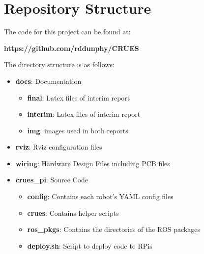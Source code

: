 
\chapter{Repository Structure}
\label{appendix/a}

The code for this project can be found at:
\begin{center}
\textbf{https://github.com/rddunphy/CRUES}
\end{center}

The directory structure is as follows: 

\begin{itemize}
	\item[] \textbf{docs}: Documentation
		\begin{itemize}
			\item[] \textbf{final}: Latex files of interim report
			\item[] \textbf{interim}: Latex files of interim report
			\item[] \textbf{img}: images used in both reports
		\end{itemize}
	\item[] \textbf{rviz}: Rviz configuration files
	\item[] \textbf{wiring}: Hardware Design Files including PCB files
	\item[] \textbf{crues\_pi}: Source Code
		\begin{itemize}
			\item[] \textbf{config}: Contains each robot's YAML config files
			\item[] \textbf{crues}: Contains helper scripts
			\item[] \textbf{ros\_pkgs}: Contains the directories of the ROS packages
			\item[] \textbf{deploy.sh}: Script to deploy code to RPis
		\end{itemize}
\end{itemize}